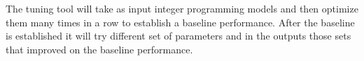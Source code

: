 The tuning tool will take as input integer programming models and then optimize
them many times in a row to establish a baseline performance. After the
baseline is established it will try different set of parameters and in the
outputs those sets that improved on the baseline performance.

